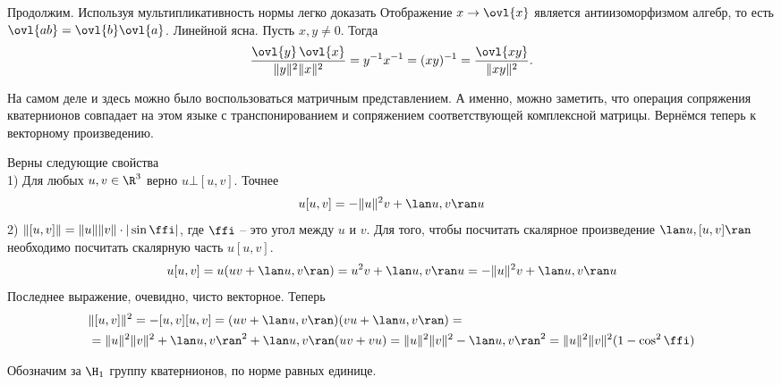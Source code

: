 Продолжим. Используя мультипликативность нормы легко доказать 
\lm Отображение $x \to \ovl{x}$ является антиизоморфизмом алгебр, то есть $\ovl{ab}=\ovl{b}\ovl{a}$.
\proof Линейной ясна. Пусть $x,y \neq 0$. Тогда $$\frac{\ovl{y}\,\ovl{x}}{\|y\|^2\|x\|^2}=y^{-1}x^{-1}=(xy)^{-1}=\frac{\ovl{xy}}{\|xy\|^2}.$$
\elm

На самом деле и здесь можно было воспользоваться матричным представлением. А именно, можно заметить, что операция сопряжения кватернионов совпадает на этом языке с транспонированием и сопряжением соответствующей комплексной матрицы. Вернёмся теперь к векторному произведению.





 Верны следующие свойства\\
1) Для любых $u,v \in \R^3$ верно $u\bot [u,v]$. Точнее $$u[u,v]= -\|u\|^2v+ \lan u,v\ran u$$
2) $\| [u,v]\|= \|u\|\|v\| \cdot |\sin \ffi |$, где $\ffi$ --  это угол между $u$ и $v$.
\elm
\proof Для того, чтобы посчитать скалярное произведение $\lan u, [u,v]\ran$ необходимо посчитать скалярную часть $u[u,v]$. 
$$u[u,v]= u (uv+ \lan u,v \ran)= u^2 v+ \lan u,v \ran u= -\|u\|^2 v+ \lan u,v \ran u$$
Последнее выражение, очевидно, чисто векторное.
Теперь
\begin{align*}
&\|[u,v]\|^2= -[u,v][u,v]= (uv + \lan u,v\ran)(vu + \lan u,v\ran)=\\
&=\|u\|^2\|v\|^2+ \lan u,v\ran^2 + \lan u,v\ran (uv+vu)=\|u\|^2\|v\|^2 - \lan u,v\ran^2= \|u\|^2\|v\|^2(1-\cos^2 \ffi)
\end{align*}
\endproof

\dfn Обозначим за $\H_{1}$ группу кватернионов, по норме равных единице.
\edfn

